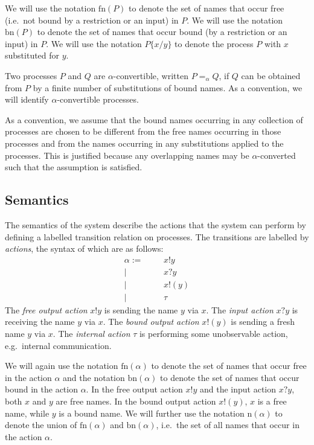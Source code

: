\documentclass[a4paper]{article}
\newcommand{\freenames}[1]{\textrm{fn}(#1)}
\newcommand{\boundnames}[1]{\textrm{bn}(#1)}
\newcommand{\names}[1]{\textrm{n}(#1)}
\newcommand{\alphacon}[2]{#1 =_{\alpha} #2}
\newcommand{\subst}[3]{#1\{#2/#3\}}
\newcommand{\Aoutf}[2]{#1 ! #2}
\newcommand{\Aoutb}[2]{#1 ! (#2)}
\newcommand{\Ain}[2]{#1 ? #2}
\newcommand{\Atau}{\tau}
\begin{document}
We will use the notation \( \freenames{P} \) to denote the set of names that occur free (i.e.\ not bound by a restriction or an input) in \( P \).
We will use the notation \( \boundnames{P} \) to denote the set of names that occur bound (by a restriction or an input) in \( P \).
We will use the notation \( \subst{P}{x}{y} \) to denote the process \( P \) with \( x \) substituted for \( y \).

Two processes \( P \) and \( Q \) are \( \alpha \)-convertible, written \( \alphacon{P}{Q} \), if \( Q \) can be obtained from \( P \) by a finite number of substitutions of bound names.
As a convention, we will identify \( \alpha \)-convertible processes.

As a convention, we assume that the bound names occurring in any collection of processes are chosen to be different from the free names occurring in those processes and from the names occurring in any substitutions applied to the processes.
This is justified because any overlapping names may be \( \alpha \)-converted such that the assumption is satisfied.

\subsection{Semantics}
The semantics of the system describe the actions that the system can perform by defining a labelled transition relation on processes.
The transitions are labelled by \emph{actions}, the syntax of which are as follows:
\begin{align*}
  \alpha := &&& \Aoutf{x}{y} \\
  |&&& \Ain{x}{y} \\
  |&&& \Aoutb{x}{y} \\
  |&&& \Atau
\end{align*}
The \emph{free output action} \( \Aoutf{x}{y} \) is sending the name \( y \) via \( x \).
The \emph{input action} \( \Ain{x}{y} \) is receiving the name \( y \) via \( x \).
The \emph{bound output action} \( \Aoutb{x}{y} \) is sending a fresh name \( y \) via \( x \).
The \emph{internal action} \( \Atau \) is performing some unobservable action, e.g.\ internal communication.

We will again use the notation \( \freenames{\alpha} \) to denote the set of names that occur free in the action \( \alpha \) and the notation \( \boundnames{\alpha} \) to denote the set of names that occur bound in the action \( \alpha \).
In the free output action \( \Aoutf{x}{y} \) and the input action \( \Ain{x}{y} \), both \( x \) and \( y \) are free names.
In the bound output action \( \Aoutb{x}{y} \), \( x \) is a free name, while \( y \) is a bound name.
We will further use the notation \( \names{\alpha} \) to denote the union of \( \freenames{\alpha} \) and \( \boundnames{\alpha} \), i.e.\ the set of all names that occur in the action \( \alpha \).
\end{document}
